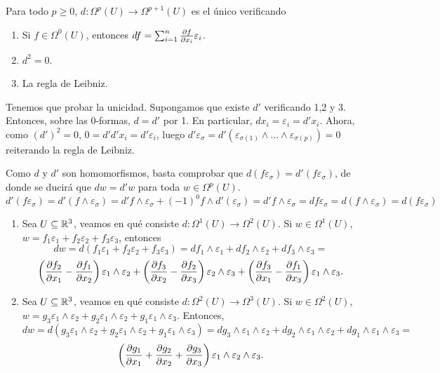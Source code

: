 \documentclass[CV.tex]{subfiles}
\begin{document}
\begin{teorema}
Para todo $p\geq 0$, $d:\Omega^p(U)\to\Omega^{p+1}(U)$ es el único verificando 
\begin{enumerate}
\item Si $f\in\Omega^0(U)$, entonces $df=\sum_{i=1}^n\frac{\partial f}{\partial x_i}\varepsilon_i$. 
\item $d^2=0$.
\item La regla de Leibniz.
\end{enumerate}
\end{teorema}
\begin{dem}
Tenemos que probar la unicidad. Supongamos que existe $d'$ verificando 1,2 y 3. Entonces, sobre las 0-formas, $d=d'$ por 1. En particular, $dx_i=\varepsilon_i=d'x_i$. Ahora, como $(d')^2=0$, $0=d'd'x_i=d'\varepsilon_i$, luego $d'\varepsilon_{\sigma}=d'(\varepsilon_{\sigma(1)}\land\dots\land\varepsilon_{\sigma(p)})=0$ reiterando la regla de Leibniz.  

Como $d$ y $d'$ son homomorfismos, basta comprobar que $d(f\varepsilon_{\sigma})=d'(f\varepsilon_{\sigma})$, de donde se ducirá que $dw=d'w$ para toda $w\in\Omega^p(U)$. 
\[
d'(f\varepsilon_{\sigma})=d'(f\land\varepsilon_{\sigma})=d'f\land\varepsilon_{\sigma}+(-1)^0f\land d'(\varepsilon_{\sigma})=d'f\land\varepsilon_{\sigma}=df\varepsilon_{\sigma}=d(f\land\varepsilon_{\sigma})=d(f\varepsilon_{\sigma})
\]
\QED
\end{dem}

\begin{ej}
\begin{enumerate}
\item Sea $U\subseteq\mathbb{R}^3$, veamos en qué consiste $d:\Omega^1(U)\to\Omega^2(U)$. Si $w\in\Omega^1(U)$, $w=f_1\varepsilon_1+f_2\varepsilon_2+f_3\varepsilon_3$, entonces 
\[dw=d(f_1\varepsilon_1+f_2\varepsilon_2+f_3\varepsilon_3)=df_1\land\varepsilon_1+df_2\land\varepsilon_2+df_3\land\varepsilon_3=
\]
\[
\left(\frac{\partial f_2}{\partial x_1}-\frac{\partial f_1}{\partial x_2}\right)\varepsilon_1\land\varepsilon_2+\left(\frac{\partial f_3}{\partial x_2}-\frac{\partial f_2}{\partial x_3}\right)\varepsilon_2\land\varepsilon_3+\left(\frac{\partial f_3}{\partial x_1}-\frac{\partial f_1}{\partial x_3}\right)\varepsilon_1\land\varepsilon_3.
\]
\item Sea $U\subseteq\mathbb{R}^3$, veamos en qué consiste $d:\Omega^2(U)\to\Omega^3(U)$. Si $w\in\Omega^2(U)$,
$w=g_3\varepsilon_1\land\varepsilon_2+g_2\varepsilon_1\land\varepsilon_2+g_1\varepsilon_1\land\varepsilon_3$. Entonces, 
\[
dw=d(g_3\varepsilon_1\land\varepsilon_2+g_2\varepsilon_1\land\varepsilon_2+g_1\varepsilon_1\land\varepsilon_3)=dg_3\land\varepsilon_1\land\varepsilon_2+dg_2\land\varepsilon_1\land\varepsilon_2+dg_1\land\varepsilon_1\land\varepsilon_3=
\]
\[
\left(\frac{\partial g_1}{\partial x_1}+\frac{\partial g_2}{\partial x_2}+\frac{\partial g_3}{\partial x_3}\right)\varepsilon_1\land\varepsilon_2\land\varepsilon_3.
\]
\end{enumerate}
\end{ej}
\end{document}
